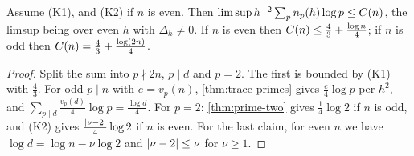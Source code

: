 \begin{proposition}\label{prop:arithmetic}
Assume \textup{(K1)}, and \textup{(K2)} if $n$ is even. Then
$\limsup h^{-2}\sum_pn_p(h)\log p\le C(n)$, the limsup being over even $h$ with $\Delta_h\ne0$.
If $n$ is even then $C(n)\le\frac43+\frac{\log n}4$; if $n$ is odd then $C(n)=\frac43+\frac{\log(2n)}4$.
\end{proposition}

\begin{proof}
Split the sum into $p\nmid 2n$, $p\mid d$ and $p=2$. The first is bounded by (K1) with $\frac43$. For
odd $p\mid n$ with $e=v_p(n)$, \cref{thm:trace-primes} gives $\frac e4\log p$ per $h^2$, and
$\sum_{p\mid d}\frac{v_p(d)}4\log p=\frac{\log d}4$. For $p=2$: \cref{thm:prime-two} gives $\frac14\log2$ if $n$
is odd, and (K2) gives $\frac{\left\lvert \nu-2\right\rvert}4\log2$ if $n$ is even. For the last claim, for even $n$ we have
$\log d=\log n-\nu\log2$ and $\left\lvert \nu-2\right\rvert\le\nu$ for $\nu\ge1$.
\end{proof}
